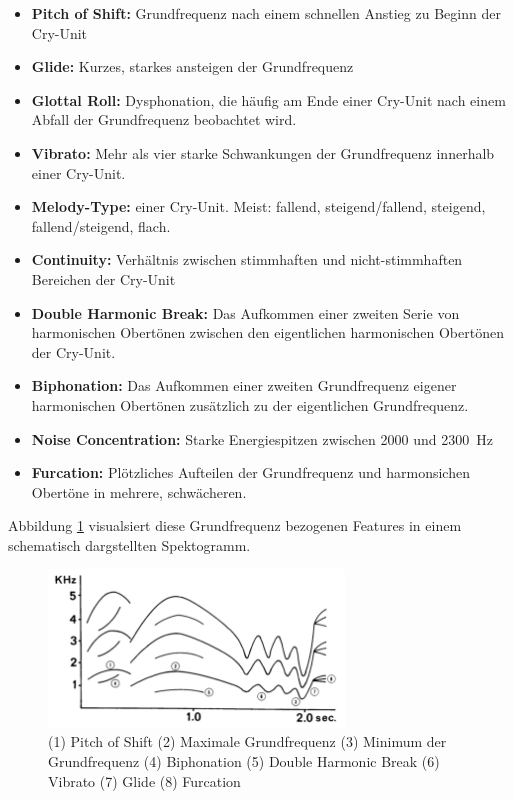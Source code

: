 \begin{itemize}
\item \textbf{Pitch of Shift:} Grundfrequenz nach einem schnellen Anstieg zu Beginn der Cry-Unit
\item \textbf{Glide:} Kurzes, starkes ansteigen der Grundfrequenz
\item  \textbf{Glottal Roll:} Dysphonation, die häufig am Ende einer Cry-Unit nach einem Abfall der Grundfrequenz beobachtet wird.
\item  \textbf{Vibrato:} Mehr als vier starke Schwankungen der Grundfrequenz innerhalb einer Cry-Unit.
\item  \textbf{Melody-Type:} einer Cry-Unit. Meist: fallend, steigend/fallend, steigend, fallend/steigend, flach. 
\item  \textbf{Continuity:} Verhältnis zwischen stimmhaften und nicht-stimmhaften Bereichen der Cry-Unit
\item  \textbf{Double Harmonic Break:} Das Aufkommen einer zweiten Serie von harmonischen Obertönen zwischen den eigentlichen harmonischen Obertönen der Cry-Unit.
\item  \textbf{Biphonation:} Das Aufkommen einer zweiten Grundfrequenz eigener harmonischen Obertönen zusätzlich zu der eigentlichen Grundfrequenz.
\item  \textbf{Noise Concentration:} Starke Energiespitzen zwischen 2000 und \SI{2300}{\hertz}
\item  \textbf{Furcation:} Plötzliches Aufteilen der Grundfrequenz und harmonsichen Obertöne in mehrere, schwächeren.
\end{itemize}

Abbildung \ref{img:cryMelodies} visualsiert diese Grundfrequenz bezogenen Features in einem schematisch dargstellten Spektogramm.

\begin{figure}
	\centering
	\includegraphics[width=0.7\textwidth]{bilder/melodyTypes.png}
	\caption{(1) Pitch of Shift (2) Maximale Grundfrequenz (3) Minimum der Grundfrequenz (4) Biphonation (5) Double Harmonic Break (6) Vibrato (7) Glide (8) Furcation \cite[S. 298]{justForTheMelody}}
	\label{img:cryMelodies}
\end{figure}

